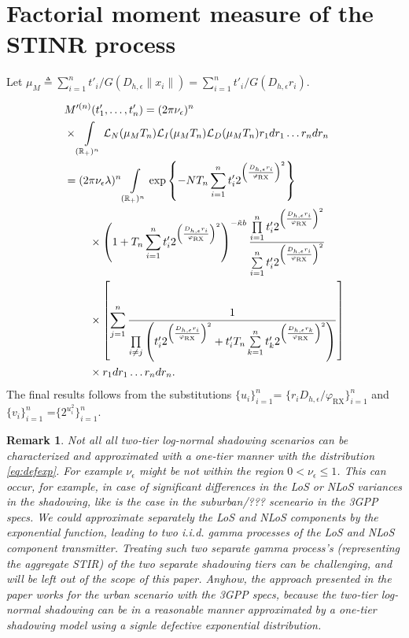 \documentclass[lettersize,journal]{IEEEtran}
\newcommand{\R}{\mathbb{R}}
\newtheorem*{remark}{Remark}
\begin{document}
\appendices

\section{Factorial moment measure of the STINR process}
Let $\mu_M \triangleq \sum_{i=1}^nt'_i/G(D_{h,\epsilon}\|x_i\|)=\sum_{i=1}^nt'_i/G(D_{h,\epsilon} r_i)$.

\begin{align}
  &M'^{(n)}(t'_1,\dots,t'_n) =(2 \pi \nu_{\epsilon})^n\nonumber\\
  & \times\int\limits_{(\R_+)^n} \mathcal{L}_N(\mu_MT_n)\mathcal{L}_I(\mu_MT_n)\mathcal{L}_D(\mu_MT_n) r_1 dr_1 \dots r_n dr_n\nonumber \\
  &=(2 \pi \nu_{\epsilon} \lambda)^n \int\limits_{(\R_+)^n} \exp\left\{-NT_n\sum\limits_{i=1}^nt'_i2^{\left(\frac{D_{h,\epsilon}r_i}{\varphi_{\text{RX}}}\right)^2}\right\} \nonumber\\
  &\hspace{0.8cm}\times\left(1+T_n\sum\limits_{i=1}^nt'_i2^{\left(\frac{D_{h,\epsilon}r_i}{\varphi_{\text{RX}}}\right)^2}\right)^{- \tilde{\kappa}b} \frac{\prod\limits_{i=1}^nt'_i2^{\left(\frac{D_{h,\epsilon}r_i}{\varphi_{\text{RX}}}\right)^2}}{\sum\limits_{i=1}^nt'_i2^{\left(\frac{D_{h,\epsilon}r_i}{\varphi_{\text{RX}}}\right)^2}} \nonumber\\
  &\hspace{0.8cm}\times  \left[\sum\limits_{j=1}^n\frac{1}{\prod\limits_{i\neq j}\left(t'_i 2^{\left(\frac{D_{h,\epsilon}r_i}{\varphi_{\text{RX}}}\right)^2}+ t_i'T_n\sum\limits_{k=1}^nt'_k2^{\left(\frac{D_{h,\epsilon}r_k}{\varphi_{\text{RX}}}\right)^2} \right)} \right] \nonumber\\
  &\hspace{0.8cm}\times r_1 dr_1 \dots r_n dr_n.
\end{align}
The final results follows from the substitutions $\{u_i\}_{i= 1}^n$= $\{r_i D_{h,\epsilon}/\varphi_{\text{RX}}\}_{i= 1}^n$ and $\{v_i\}_{i= 1}^n$ =$\{ 2^{u^2_i}\}_{i= 1}^n$.





\begin{remark}
  Not all all two-tier log-normal shadowing scenarios can be characterized and approximated with a one-tier manner with the distribution \eqref{eq:defexp}. For example $\nu_{\epsilon}$ might be not within the region $0<\nu_{\epsilon} \leq 1$. This can occur, for example, in case of significant differences in the LoS or NLoS variances in the shadowing, like is the case in the suburban/??? sceneario in the 3GPP specs. We could approximate separately the LoS and NLoS components by the exponential function, leading to two i.i.d. gamma processes of the LoS and NLoS component transmitter. Treating such two separate gamma process's (representing the aggregate STIR) of the two separate shadowing tiers can be challenging, and will be left out of the scope of this paper. Anyhow, the approach presented in the paper works for the urban scenario with the 3GPP specs, because the two-tier log-normal shadowing can be in a reasonable manner approximated by a one-tier shadowing model using a signle defective exponential distribution.
\end{remark}



%

\end{document}
